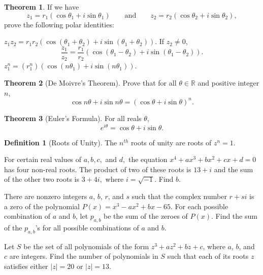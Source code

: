 \documentclass[12pt,a4paper]{memoir}
\theoremstyle{definition}
\newtheorem*{definition}{Definition}
\newtheorem{theorem}{Theorem}
\begin{document}
\begin{theorem}
	If we have 
	\[z_1 = r_1(\cos \theta_1 + i\sin\theta_1) \qquad \text{and} \qquad z_2 = r_2(\cos \theta_2 + i\sin\theta_2),\]
	prove the following polar identities:
	\begin{tasks}
		\task $z_1z_2 = r_1r_2(\cos(\theta_1+\theta_2)+i\sin(\theta_1+\theta_2))$.
		\task If $z_2 \neq 0$,
		\[\frac{z_1}{z_2}= \frac{r_1}{r_2}(\cos(\theta_1-\theta_2)+i\sin(\theta_1-\theta_2)).\]
		\task $z_1^n = (r_1^n)\left(\cos(n\theta_1) + i \sin(n\theta_1)\right)$.
	\end{tasks}
\end{theorem}


\begin{theorem}[De Moivre’s Theorem]
	Prove that for all $\theta \in \mathbb R$ and positive integer $n$,
	\[\cos n\theta + i\sin n\theta = (\cos\theta+i\sin\theta)^n.\]
\end{theorem}

\begin{theorem}[Euler's Formula]
	For all reals $\theta$,
	\[e^{i\theta}= \cos\theta+i\sin\theta.\]
\end{theorem}

\begin{definition}[Roots of Unity]
	The $n^{th}$ roots of unity are roots of $z^n = 1$.
\end{definition}

\begin{question}[name={1995 AIME \#5}]
	For certain real values of $a, b, c,$ and $d,$ the equation $x^4+ax^3+bx^2+cx+d=0$ has four non-real roots. The product of two of these roots is $13+i$ and the sum of the other two roots is $3+4i,$ where $i=\sqrt{-1}$. Find $b$.
\end{question}

\begin{question}[name={2013 AIME I \#10}]
	There are nonzero integers $a$, $b$, $r$, and $s$ such that the complex number $r+si$ is a zero of the polynomial $P(x) = x^3 - ax^2 + bx - 65$. For each possible combination of $a$ and $b$, let $p_{a,b}$ be the sum of the zeroes of $P(x)$. Find the sum of the $p_{a,b}$'s for all possible combinations of $a$ and $b$.
\end{question}

\begin{question}[name={2013 AIME II \#12}]
	Let $S$ be the set of all polynomials of the form $z^3+az^2+bz+c$, where $a$, $b$, and $c$ are integers. Find the number of polynomials in $S$ such that each of its roots $z$ satisfies either $\left\lvert z \right\rvert = 20$ or $\left\lvert z \right\rvert = 13$.	
\end{question}
\end{document}
